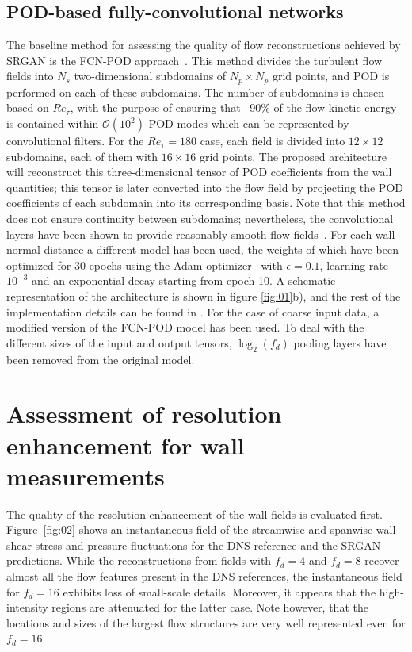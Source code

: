 \subsection{POD-based fully-convolutional networks}
The baseline method for assessing the quality of flow reconstructions achieved by SRGAN is the FCN-POD approach~\citep{guemes2019sensing,guastoni2020convolutional}.
This method divides the turbulent flow fields into $N_s$ two-dimensional subdomains of $N_p\times N_p$ grid points, and POD is performed on each of these subdomains.
The number of subdomains is chosen based on $Re_{\tau}$, with the purpose of ensuring that ~90\% of the flow kinetic energy is contained within $\mathcal{O}(10^2)$ POD modes which can be represented by convolutional filters.
For the  $Re_{\tau}=180$ case, each field is divided into $12\times12$ subdomains, each of them with $16\times16$ grid points.
The proposed architecture will reconstruct this three-dimensional tensor of POD coefficients from the wall quantities; this tensor is later converted into the flow field by projecting the POD coefficients of each subdomain into its corresponding basis.
Note that this method does not ensure continuity between subdomains; nevertheless, the convolutional layers have been shown to provide reasonably smooth flow fields~\citep{guastoni2020convolutional}.
For each wall-normal distance a different model has been used, the weights of which have been optimized for 30 epochs using the Adam optimizer~\citep{kingma2014adam} with $\epsilon=0.1$, learning rate $10^{-3}$ and an exponential decay starting from epoch 10.
A schematic representation of the architecture is shown in figure \ref{fig:01}b), and the rest of the implementation details can be found in \citet{guastoni2020convolutional}.
For the case of coarse input data, a modified version of the FCN-POD model has been used.
To deal with the different sizes of the input and output tensors, $\log_2(f_d)$ pooling layers have been removed from the original model.

\section{Assessment of resolution enhancement for wall measurements}\label{sec:wall}

The quality of the resolution enhancement of the wall fields is evaluated first.
Figure~\ref{fig:02} shows an instantaneous field of the streamwise and spanwise wall-shear-stress  and pressure fluctuations for the DNS reference and the SRGAN predictions.
While the reconstructions from fields with $f_d=4$ and $f_d=8$ recover almost all the flow features present in the DNS references, the instantaneous field for $f_d=16$ exhibits loss of small-scale details.
Moreover, it appears that the high-intensity regions are attenuated for the latter case.
Note however, that the locations and sizes of the largest flow structures are very well represented even for $f_d=16$.

